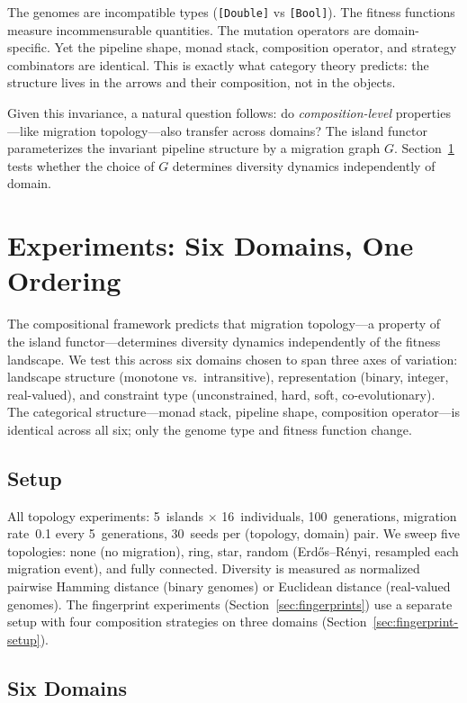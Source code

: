 \documentclass[dvipsnames,format=sigconf,anonymous=true,review=true]{acmart}
\begin{document}
The genomes are incompatible types (\texttt{[Double]} vs \texttt{[Bool]}). The fitness functions measure incommensurable quantities. The mutation operators are domain-specific. Yet the pipeline shape, monad stack, composition operator, and strategy combinators are identical. This is exactly what category theory predicts: the structure lives in the arrows and their composition, not in the objects.

Given this invariance, a natural question follows: do \emph{composition-level} properties---like migration topology---also transfer across domains? The island functor parameterizes the invariant pipeline structure by a migration graph $G$. Section~\ref{sec:experiments} tests whether the choice of $G$ determines diversity dynamics independently of domain.


\section{Experiments: Six Domains, One Ordering}
\label{sec:experiments}

The compositional framework predicts that migration topology---a property of the island functor---determines diversity dynamics independently of the fitness landscape. We test this across six domains chosen to span three axes of variation: landscape structure (monotone vs.\ intransitive), representation (binary, integer, real-valued), and constraint type (unconstrained, hard, soft, co-evolutionary). The categorical structure---monad stack, pipeline shape, composition operator---is identical across all six; only the genome type and fitness function change.

\subsection{Setup}

All topology experiments: 5~islands $\times$ 16~individuals, 100~generations, migration rate~0.1 every 5~generations, 30~seeds per (topology, domain) pair. We sweep five topologies: none (no migration), ring, star, random (Erd\H{o}s--R\'{e}nyi, resampled each migration event), and fully connected. Diversity is measured as normalized pairwise Hamming distance (binary genomes) or Euclidean distance (real-valued genomes). The fingerprint experiments (Section~\ref{sec:fingerprints}) use a separate setup with four composition strategies on three domains (Section~\ref{sec:fingerprint-setup}).

\subsection{Six Domains}
\end{document}
